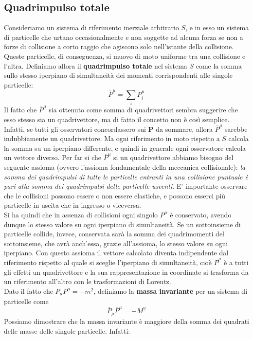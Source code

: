 \documentclass[a4paper,11pt]{book}
\theoremstyle{plain}
\theoremstyle{definition}
\begin{document}
\subsection{Quadrimpulso totale}
Consideriamo un sistema di riferimento inerziale arbitrario $S$, e in esso un sistema di particelle che urtano occasionalmente e non soggette ad alcuna forza se non a forze di collisione a corto raggio che agiscono solo nell'istante della collisione. Queste particelle, di conseguenza, si muovo di moto uniforme tra una collisione e l'altra. Definiamo allora il \textbf{quadrimpulso totale} nel sistema $S$ come la somma sullo stesso iperpiano di simultaneità dei momenti corrispondenti alle singole particelle:
\[
\overline{P}^{\mu} = \sum_{i}P^{\mu}_i
\]
Il fatto che $\overline{P}^{\mu}$ sia ottenuto come somma di quadrivettori sembra suggerire che esso stesso sia un quadrivettore, ma di fatto il concetto non è così semplice. Infatti, se tutti gli osservatori concordassero sui $\textbf{P}$ da sommare, allora $\overline{P}^{\mu}$ sarebbe indubbiamente un quadrivettore. Ma ogni riferimento in moto rispetto a $S$ calcola la somma su un iperpiano differente, e quindi in generale ogni osservatore calcola un vettore diverso. Per far si che $\overline{P}^{\mu}$ si un quadrivettore abbiamo bisogno del seguente assioma (ovvero l'assioma fondamentale della meccanica collisionale): \emph{la somma dei quadrimpulsi di tutte le particelle entranti in una collisione puntuale è pari alla somma dei quadrimpulsi delle particelle uscenti}. E' importante osservare che le collisioni possono essere o non essere elastiche, e possono esserci più particelle in uscita che in ingresso o viceversa.\\
 Si ha quindi che in assenza di collisioni ogni singolo $P^{\mu}$ è conservato, avendo dunque lo stesso valore su ogni iperpiano di simultaneità. Se un sottoinsieme di particelle collide, invece, conservata sarà la somma dei quadrimomenti del sottoinsieme, che avrà anch'essa, grazie all'assioma, lo stesso valore su ogni iperpiano. Con questo assioma il vettore calcolato diventa indipendente dal riferimento rispetto al quale si sceglie l'iperpiano di simultaneità, cioè $\overline{P}^{\mu}$ è a tutti gli effetti un quadrivettore e la sua rappresentazione in coordinate si trasforma da un riferimento all'altro con le trasformazioni di Lorentz.
\\
Dato il fatto che $P_{\mu}P^{\mu}=-m^2$, definiamo la \textbf{massa invariante} per un sistema di particelle come
\[
\overline{P}_{\mu}\overline{P}^{\mu}=-M^2
\]
Possiamo dimostrare che la massa invariante è maggiore della somma dei quadrati delle masse delle singole particelle. Infatti:
\end{document}
